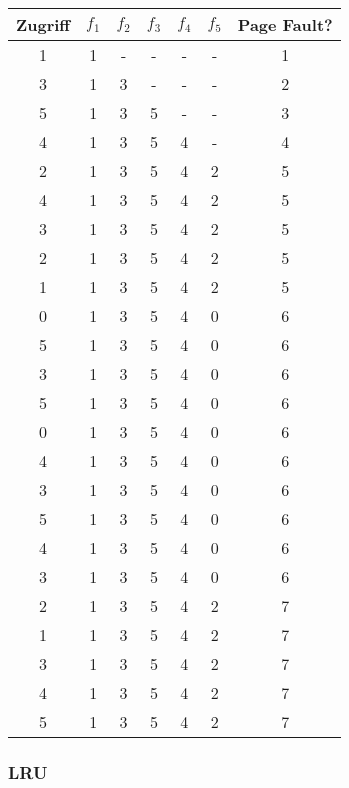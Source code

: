 \documentclass[10pt,a4paper]{article}
\begin{document}
\begin{tabular}{c|c|c|c|c|c|c}
  Zugriff & $f_{1}$ & $f_{2}$ & $f_{3}$ & $f_{4}$ & $f_{5}$ & Page Fault?\\\hline
  1 & 1 & - & - & - & - & 1\\
  3 & 1 & 3 & - & - & - & 2\\
  5 & 1 & 3 & 5 & - & - & 3\\
  4 & 1 & 3 & 5 & 4 & - & 4\\
  2 & 1 & 3 & 5 & 4 & 2 & 5\\
  4 & 1 & 3 & 5 & 4 & 2 & 5\\
  3 & 1 & 3 & 5 & 4 & 2 & 5\\
  2 & 1 & 3 & 5 & 4 & 2 & 5\\
  1 & 1 & 3 & 5 & 4 & 2 & 5\\
  0 & 1 & 3 & 5 & 4 & 0 & 6\\
  5 & 1 & 3 & 5 & 4 & 0 & 6\\
  3 & 1 & 3 & 5 & 4 & 0 & 6\\
  5 & 1 & 3 & 5 & 4 & 0 & 6\\
  0 & 1 & 3 & 5 & 4 & 0 & 6\\
  4 & 1 & 3 & 5 & 4 & 0 & 6\\
  3 & 1 & 3 & 5 & 4 & 0 & 6\\
  5 & 1 & 3 & 5 & 4 & 0 & 6\\
  4 & 1 & 3 & 5 & 4 & 0 & 6\\
  3 & 1 & 3 & 5 & 4 & 0 & 6\\
  2 & 1 & 3 & 5 & 4 & 2 & 7\\
  1 & 1 & 3 & 5 & 4 & 2 & 7\\
  3 & 1 & 3 & 5 & 4 & 2 & 7\\
  4 & 1 & 3 & 5 & 4 & 2 & 7\\
  5 & 1 & 3 & 5 & 4 & 2 & 7\\
\end{tabular}

\subsubsection*{LRU}
\end{document}

